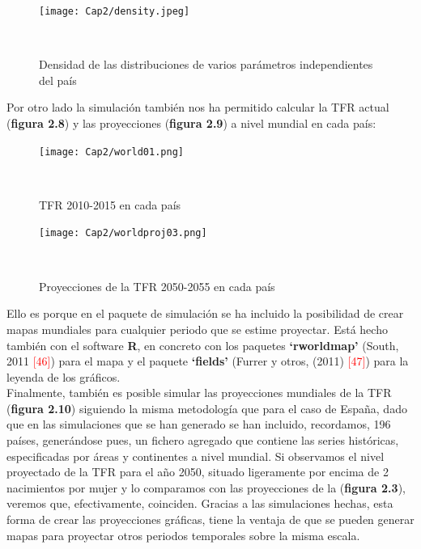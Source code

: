 \newpage
\vspace{-0.3cm}
\begin{figure}[!ht]
\centering
\hspace*{-0.1cm}
\texttt{[image: Cap2/density.jpeg]}
\caption{Densidad de las distribuciones de varios parámetros independientes del país}\\
\end{figure}

\vspace{0.3cm}
Por otro lado la simulación también nos ha permitido calcular la TFR actual (\textbf{figura 2.8}) y las proyecciones (\textbf{figura 2.9}) a nivel mundial en cada país:

\begin{figure}[!htp]
\centering
\hspace*{0cm}
\texttt{[image: Cap2/world01.png]}
\caption{TFR 2010-2015 en cada país}\\
\end{figure}

\begin{figure}[!htp]
\centering
\hspace*{-0.5cm}
\texttt{[image: Cap2/worldproj03.png]}
\caption{Proyecciones de la TFR 2050-2055 en cada país}\\
\end{figure}

Ello es porque en el paquete de simulación se ha incluido la posibilidad de crear mapas mundiales para cualquier periodo que se estime proyectar. Está hecho también con el software \textsf{\textbf{R}}, en concreto con los paquetes \textbf{`rworldmap'} (South, 2011 \textcolor{red}{[46]}) para el mapa y el paquete \textbf{`fields'} (Furrer y otros, (2011) \textcolor{red}{[47]}) para la leyenda de los gráficos.\\

Finalmente, también es posible simular las proyecciones mundiales de la TFR (\textbf{figura 2.10}) siguiendo la misma metodología que para el caso de España, dado que en las simulaciones que se han generado se han incluido, recordamos, 196 países, generándose pues, un fichero agregado que contiene las series históricas, especificadas por \'areas y continentes a nivel mundial. Si observamos el nivel proyectado de la TFR para el año 2050, situado ligeramente por encima de 2 nacimientos por mujer y lo comparamos con las proyecciones de la (\textbf{figura 2.3}), veremos que, efectivamente, coinciden. Gracias a las simulaciones hechas, esta forma de crear las proyecciones gráficas, tiene la ventaja de que se pueden generar mapas para proyectar otros periodos temporales sobre la misma escala.

